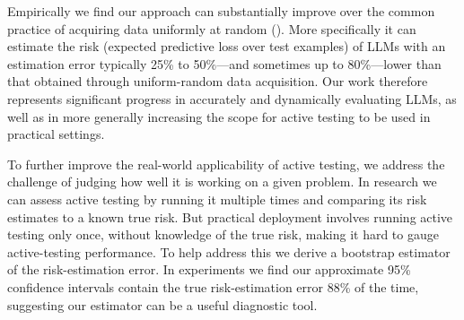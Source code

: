 Empirically we find our approach can substantially improve over the common practice of acquiring data uniformly at random ().
More specifically it can estimate the risk (expected predictive loss over test examples) of LLMs with an estimation error typically 25\% to 50\%---and sometimes up to 80\%---lower than that obtained through uniform-random data acquisition.
Our work therefore represents significant progress in accurately and dynamically evaluating LLMs, as well as in more generally increasing the scope for active testing to be used in practical settings.

To further improve the real-world applicability of active testing, we address the challenge of judging how well it is working on a given problem.
In research we can assess active testing by running it multiple times and comparing its risk estimates to a known true risk.
But practical deployment involves running active testing only once, without knowledge of the true risk, making it hard to gauge active-testing performance.
To help address this we derive a bootstrap estimator \citep{efron1979bootstrap} of the risk-estimation error.
In experiments we find our approximate 95\% confidence intervals contain the true risk-estimation error 88\% of the time, suggesting our estimator can be a useful diagnostic tool.